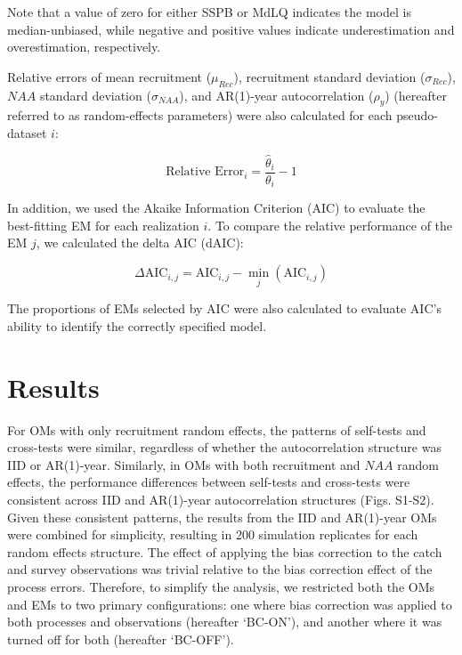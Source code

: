 \documentclass[
  12pt,
]{article}
\begin{document}
Note that a value of zero for either SSPB or MdLQ indicates the model is
median-unbiased, while negative and positive values indicate
underestimation and overestimation, respectively.

Relative errors of mean recruitment (\(\mu_{Rec}\)), recruitment
standard deviation (\(\sigma_{Rec}\)), \(NAA\) standard deviation
(\(\sigma_{NAA}\)), and AR(1)-year autocorrelation (\(\rho_{y}\))
(hereafter referred to as random-effects parameters) were also
calculated for each pseudo-dataset \(i\):

\begin{equation}
\text{Relative Error}_{i} = \frac{\hat{\theta}_{i}}{\theta_{i}} - 1
\end{equation}

In addition, we used the Akaike Information Criterion (AIC) to evaluate
the best-fitting EM for each realization \(i\). To compare the relative
performance of the EM \(j\), we calculated the delta AIC (dAIC):

\begin{equation}
\Delta\text{AIC}_{i,j} = \text{AIC}_{i,j} - \min_{j}(\text{AIC}_{i,j})
\end{equation}

The proportions of EMs selected by AIC were also calculated to evaluate
AIC's ability to identify the correctly specified model.

\hypertarget{results}{%
\section{Results}\label{results}}

For OMs with only recruitment random effects, the patterns of self-tests
and cross-tests were similar, regardless of whether the autocorrelation
structure was IID or AR(1)-year. Similarly, in OMs with both recruitment
and \(NAA\) random effects, the performance differences between
self-tests and cross-tests were consistent across IID and AR(1)-year
autocorrelation structures (Figs. S1-S2). Given these consistent
patterns, the results from the IID and AR(1)-year OMs were combined for
simplicity, resulting in 200 simulation replicates for each random
effects structure. The effect of applying the bias correction to the
catch and survey observations was trivial relative to the bias
correction effect of the process errors. Therefore, to simplify the
analysis, we restricted both the OMs and EMs to two primary
configurations: one where bias correction was applied to both processes
and observations (hereafter `BC-ON'), and another where it was turned
off for both (hereafter `BC-OFF').
\end{document}
